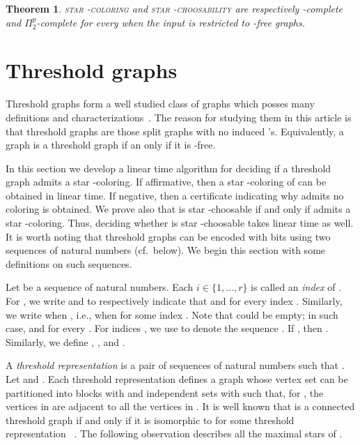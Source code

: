 \documentclass[a4paper, 11pt, oneside]{article}
\newtheorem{theorem}{Theorem}
\newcommand{\stcol}[1]{\textsc{star -coloring}}
\newcommand{\stchose}[1]{\textsc{star -choosability}}
\newcommand{\ptwop}{\ensuremath{\Pi^p_2}\xspace}
\newcommand{\range}[3]{\ensuremath{#1 \in \{#2,\ldots,#3\}}}
\let\Definition=\emph
\begin{document}
\begin{theorem}\label{thm:2k2 coloring}
 \stcol{k} and \stchose{k} are respectively \NP-complete and \ptwop-complete for every  when the input is restricted to -free graphs.
\end{theorem}

\section{Threshold graphs}
\label{sec:threshold}

\newcommand{\AsVec}[1]{[#1]}

Threshold graphs form a well studied class of graphs which posses many definitions and characterizations~\cite{Golumbic2004,MahadevPeled1995}.  The reason for studying them in this article is that threshold graphs are those split graphs with no induced 's.  Equivalently, a graph is a threshold graph if an only if it is -free.

In this section we develop a linear time algorithm for deciding if a threshold graph  admits a star -coloring.  If affirmative, then a star -coloring of  can be obtained in linear time. If negative, then a certificate indicating why  admits no coloring is obtained.  We prove also that  is star -choosable if and only if  admits a star -coloring.  Thus, deciding whether  is star -choosable takes linear time as well.  It is worth noting that threshold graphs can be encoded with  bits using two sequences of natural numbers (cf.\ below).  We begin this section with some definitions on such sequences.

Let  be a sequence of natural numbers.  Each \range{i}{1}{r} is called an \Definition{index} of .  For , we write  and  to respectively indicate that  and  for every index .  Similarly, we write  when , i.e., when  for some index .  Note that  could be empty; in such case,  and  for every .  For indices , we use  to denote the sequence .  If , then .  Similarly, we define , , and .  

A \Definition{threshold representation} is a pair  of sequences of natural numbers such that . Let  and .  Each threshold representation defines a graph  whose vertex set can be partitioned into  blocks  with  and  independent sets  with  such that, for , the vertices in  are adjacent to all the vertices in .  It is well known that  is a connected threshold graph if and only if it is isomorphic to  for some threshold representation ~\cite{Golumbic2004,MahadevPeled1995}.  The following observation describes all the maximal stars of .
\end{document}
